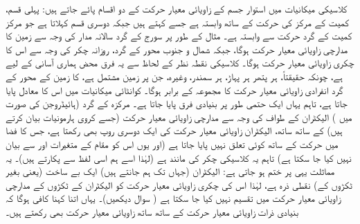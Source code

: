 کلاسیکی میکانیات میں استوار  جسم کے زاویائی معیار حرکت کے دو اقسام پائے جاتے ہیں: پہلی قسم، کمیت کے مرکز کی حرکت کے ساتھ وابستہ ہے جسے   کہتے ہیں جبکہ دوسری قسم 
  کہلاتا ہے جو مرکز کمیت کے گرد حرکت سے وابستہ ہے۔ مثال کے طور پر سورج کے گرد سالانہ مدار کی وجہ سے زمین کا مدارچی زاویائی معیار حرکت ہوگا، جبکہ شمال و جنوب محور کے گرد، روزانہ چکر کی وجہ سے اس کا چکری زاویائی معیار حرکت ہوگا۔ کلاسیکی نقطہ نظر کے لحاظ سے یہ فرق محض ہماری آسانی کے لیے ہے، چونکہ حقیقتاً، ہر پتھر ہر پہاڑ، ہر سمندر، وغیرہ، جن پر زمین مشتمل ہے، کا زمین کے محور کے گرد انفرادی  زاویائی معیار حرکت کا مجموعہ  کے برابر ہوگا۔ کوانٹائی میکانیات میں اس کا معادل پایا جاتا ہے، تاہم یہاں ایک حتمی طور پر بنیادی فرق پایا جاتا ہے۔ مرکزہ کے گرد (ہائیڈروجن کی صورت میں ) الیکٹران کے طواف کی وجہ سے مدارچی زاویائی معیار حرکت (جسے کروی ہارمونیات بیان کرتے ہیں) کے ساتھ ساتھ، الیکٹران زاویائی معیار حرکت کی ایک دوسری روپ بھی رکھتا ہے، جس کا فضا میں حرکت کے ساتھ کوئی تعلق نہیں پایا جاتا ہے (اور یوں اس کو مقام کے متغیرات   اور  سے بیان نہیں کیا جا سکتا ہے) تاہم یہ کلاسیکی چکر کی مانند ہے (لہٰذا اسے ہم اسی لفظ سے پکارتے ہیں)۔ یہ مماثلت یہی پر ختم ہو جاتی ہے: الیکٹران (جہاں تک ہم جانتے ہیں) ایک بے ساخت (یعنی بغیر ٹکڑوں کے) نقطی ذرہ ہے، لہٰذا اس کی چکری زاویائی معیار حرکت کو الیکٹران کے ٹکڑوں کے مدارچی زاویائی معیار حرکت میں تقسیم نہیں کیا جا سکتا ہے ( سوال  دیکھیں)۔ یہاں اتنا کہنا کافی ہوگا کہ بنیادی ذرات  زاویائی معیار حرکت  کے ساتھ ساتھ  زاویائی معیار حرکت  بھی رکھتے ہیں۔

